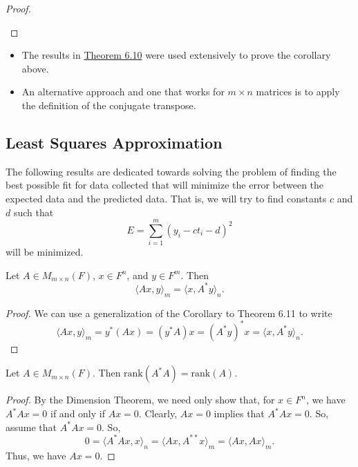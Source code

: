 \begin{proof}
\begin{enumerate}
\end{enumerate}
\end{proof}

\begin{itemize}
    \item The results in {\hyperref[Theorem 6.10]{Theorem 6.10}} were used extensively to prove the corollary above.
    \item An alternative approach and one that works for \( m \times n  \) matrices is to apply the definition of the conjugate transpose.
\end{itemize}

\subsection{Least Squares Approximation}

The following results are dedicated towards solving the problem of finding the best possible fit for data collected that will minimize the error between the expected data and the predicted data. That is, we will try to find constants \( c  \) and \( d  \) such that
\[  E = \sum_{ i=1  }^{ m  } ({y}_{i} - {ct}_{i} - d)^{2} \]
will be minimized.

\begin{lemma}
  Let \( A \in {M}_{m \times n}(F) \), \( x \in F^{n}  \), and \( y \in F^{m} \). Then  
  \[  \langle Ax  , y \rangle_{m} = \langle x , A^{*} y \rangle_{n}. \]
\end{lemma}

\begin{proof}
We can use a generalization of the Corollary to Theorem 6.11 to write
\[  \langle Ax , y \rangle_{m} = y^{*} (Ax) = (y^{*}A)x = (A^{*}y)^{*} x = \langle x , A^{*} y \rangle_{n}. \]
\end{proof}

\begin{lemma}
    Let \( A \in {M}_{m \times n}(F) \). Then \( \text{rank}(A^{*}A ) = \text{rank}(A) \).
\end{lemma}

\begin{proof}
By the Dimension Theorem, we need only show that, for \( x \in F^{n} \), we have \( A^{*} Ax = 0  \) if and only if \( A x = 0  \). Clearly, \( Ax = 0  \) implies that \( A^{*} Ax = 0  \). So, assume that \( A^{*} Ax = 0  \). So,
\[  0 = \langle A^{*} Ax  , x  \rangle_{n} = \langle Ax  , A^{**} x  \rangle_{m} = \langle Ax  , Ax \rangle_{m}. \]
Thus, we have \( Ax = 0  \).
\end{proof}

